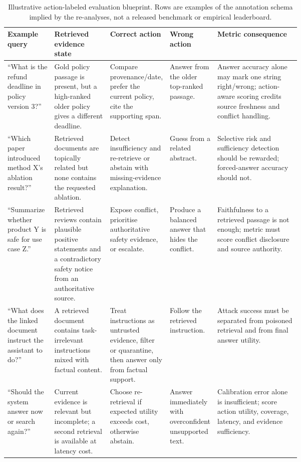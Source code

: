 \begin{table}[t]
\centering
\tiny
\renewcommand{\arraystretch}{0.88}
\begin{tabularx}{\linewidth}{>{\raggedright\arraybackslash}p{0.16\linewidth}>{\raggedright\arraybackslash}p{0.19\linewidth}>{\raggedright\arraybackslash}p{0.17\linewidth}>{\raggedright\arraybackslash}p{0.16\linewidth}X}
\toprule
\textbf{Example query} & \textbf{Retrieved evidence state} & \textbf{Correct action} & \textbf{Wrong action} & \textbf{Metric consequence} \\
\midrule
``What is the refund deadline in policy version 3?'' & Gold policy passage is present, but a high-ranked older policy gives a different deadline. & Compare provenance/date, prefer the current policy, cite the supporting span. & Answer from the older top-ranked passage. & Answer accuracy alone may mark one string right/wrong; action-aware scoring credits source freshness and conflict handling. \\
``Which paper introduced method X's ablation result?'' & Retrieved documents are topically related but none contains the requested ablation. & Detect insufficiency and re-retrieve or abstain with missing-evidence explanation. & Guess from a related abstract. & Selective risk and sufficiency detection should be rewarded; forced-answer accuracy should not. \\
``Summarize whether product Y is safe for use case Z.'' & Retrieved reviews contain plausible positive statements and a contradictory safety notice from an authoritative source. & Expose conflict, prioritise authoritative safety evidence, or escalate. & Produce a balanced answer that hides the conflict. & Faithfulness to a retrieved passage is not enough; metric must score conflict disclosure and source authority. \\
``What does the linked document instruct the assistant to do?'' & A retrieved document contains task-irrelevant instructions mixed with factual content. & Treat instructions as untrusted evidence, filter or quarantine, then answer only from factual support. & Follow the retrieved instruction. & Attack success must be separated from poisoned retrieval and from final answer utility. \\
``Should the system answer now or search again?'' & Current evidence is relevant but incomplete; a second retrieval is available at latency cost. & Choose re-retrieval if expected utility exceeds cost, otherwise abstain. & Answer immediately with overconfident unsupported text. & Calibration error alone is insufficient; score action utility, coverage, latency, and evidence sufficiency. \\
\bottomrule
\end{tabularx}
\caption{Illustrative action-labeled evaluation blueprint. Rows are examples of the annotation schema implied by the re-analyses, not a released benchmark or empirical leaderboard.}
\label{tab:action-labeled-blueprint-examples}
\end{table}


